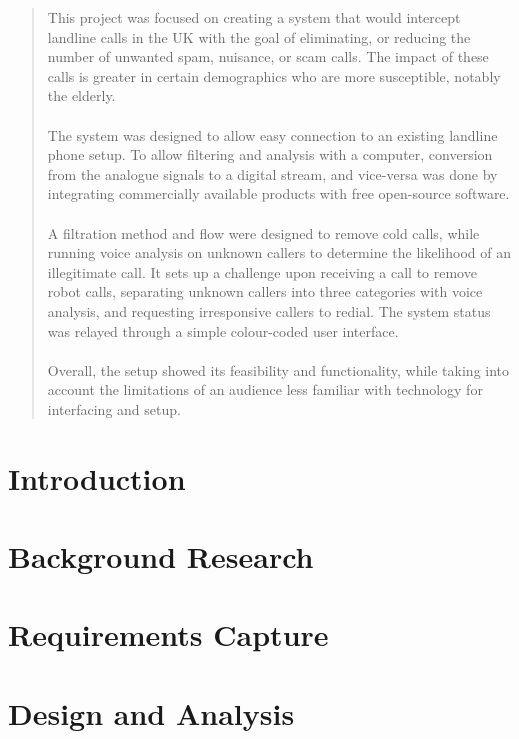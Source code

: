 \documentclass[12pt,a4paper]{report}
\begin{document}
\begin{abstract}
This project was focused on creating a system that would intercept landline calls in the UK with the goal of eliminating, or reducing the number of unwanted spam, nuisance, or scam calls. The impact of these calls is greater in certain demographics who are more susceptible, notably the elderly.
\\\\
The system was designed to allow easy connection to an existing landline phone setup. To allow filtering and analysis with a computer, conversion from the analogue signals to a digital stream, and vice-versa was done by integrating commercially available products with free open-source software.
\\\\
A filtration method and flow were designed to remove cold calls, while running voice analysis on unknown callers to determine the likelihood of an illegitimate call. It sets up a challenge upon receiving a call to remove robot calls, separating unknown callers into three categories with voice analysis, and requesting irresponsive callers to redial. The system status was relayed through a simple colour-coded user interface.
\\\\
Overall, the setup showed its feasibility and functionality, while taking into account the limitations of an audience less familiar with technology for interfacing and setup.
\end{abstract}

\tableofcontents
\newpage

\chapter{Introduction}


\chapter{Background Research}


\chapter{Requirements Capture}


\chapter{Design and Analysis}

\end{document}
